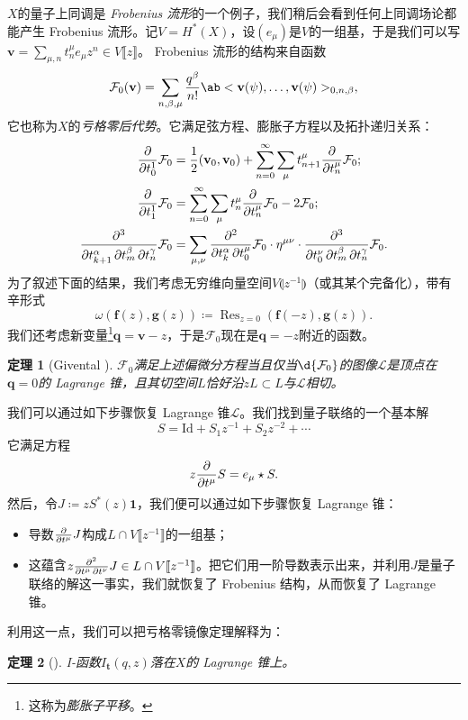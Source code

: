 \documentclass{amsart}
\newtheorem{thm}{定理}[section]
\theoremstyle{definition}
\theoremstyle{remark}
\theoremstyle{plain}
\theoremstyle{definition}
\theoremstyle{remark}
\newcommand{\mc}[1]{\mathcal{#1}}
\newcommand{\mbf}[1]{\mathbf{#1}}
\newcommand{\bv}{\mbf{v}}
\newcommand{\bq}{\mbf{q}}
\newcommand{\mr}[1]{\mathrm{#1}}
\newcommand{\on}[1]{\operatorname{#1}}
\newcommand{\1}{\mathbf{1}}
\newcommand{\2}{\mathbf{2}}
\newcommand{\3}{\mathbf{3}}
\newcommand{\ps}[1]{\llbracket #1 \rrbracket}
\newcommand{\ls}[1]{\llparenthesis #1 \rrparenthesis}
\begin{document}
\(X\)的量子上同调是 \textit{Frobenius 流形}的一个例子，我们稍后会看到任何上同调场论都能产生 Frobenius 流形。记\(V = H^*(X)\)，设\((e_{\mu})\)是\(V\)的一组基，于是我们可以写$\bv = \sum_{\mu,n} t^{\mu}_n e_{\mu} z^n \in V\ps{z}$。
Frobenius 流形的结构来自函数
\[
    \mc{F}_0(\bv) = \sum_{n, \beta, \mu} \frac{q^{\beta}}{n!} \ab<\bv(\psi), \ldots, \bv(\psi)>_{0,n,\beta},
\]
它也称为\(X\)的\textit{亏格零后代势}。它满足弦方程、膨胀子方程以及拓扑递归关系：
\begin{align*}
    \pdv{}{t_0^1} \mc{F}_0 &= \frac{1}{2} (\bv_0, \bv_0) + \sum_{n=0}^{\infty} \sum_{\mu} t_{n+1}^{\mu} \pdv{}{t_n^{\mu}} \mc{F}_0; \\
    \pdv{}{t_1^1} \mc{F}_0 &= \sum_{n=0}^{\infty} \sum_{\mu} t_n^{\mu} \pdv{}{t_n^{\mu}}\mc{F}_0 - 2 \mc{F}_0; \\
    \pdv{}{t_{k+1}^{\alpha},t_m^{\beta},t_n^{\gamma}} \mc{F}_0 &= \sum_{\mu,\nu} \pdv{}{t_k^{\alpha},t_0^{\mu}} \mc{F}_0 \cdot \eta^{\mu\nu} \cdot \pdv{}{t_0^{\nu},t_{m}^{\beta},t_n^{\gamma}} \mc{F}_0.
\end{align*}
为了叙述下面的结果，我们考虑无穷维向量空间$V\ls{z^{-1}}$（或其某个完备化），带有辛形式
\[ \omega(\mbf{f}(z), \mbf{g}(z)) \coloneqq \on{Res}_{z=0}(\mbf{f}(-z), \mbf{g}(z)). \]
我们还考虑新变量\footnote{这称为\textit{膨胀子平移}。}$\bq = \bv - z$，于是$\mc{F}_0$现在是$\bq = -z$附近的函数。

\begin{thm}[Givental {\cite{Givental2004}}]
    $\mc{F}_0$满足上述偏微分方程当且仅当$\d{\mc{F}_0}$的图像$\mc{L}$是顶点在$\bq = 0$的 Lagrange 锥，且其切空间$L$恰好沿$zL \subset L$与$\mc{L}$相切。
\end{thm}

我们可以通过如下步骤恢复 Lagrange 锥$\mc{L}$。我们找到量子联络的一个基本解
\[ S = \mr{Id} + S_1 z^{-1} + S_2 z^{-2} + \cdots \]
它满足方程
\[ z \pdv{}{t^{\mu}}S = e_{\mu} \star S. \]
然后，令$J \coloneqq z S^*(z) \1$，我们便可以通过如下步骤恢复 Lagrange 锥：
\begin{itemize}
    \item 导数$\pdv{}{t^{\mu}} J$构成$L \cap V\ps{z^{-1}}$的一组基；
    \item 这蕴含$z \pdv{}{t^{\mu},t^{\nu}} J \in L \cap V \ps{z^{-1}}$。把它们用一阶导数表示出来，并利用$J$是量子联络的解这一事实，我们就恢复了 Frobenius 结构，从而恢复了 Lagrange 锥。
\end{itemize}

利用这一点，我们可以把亏格零镜像定理解释为：
\begin{thm}[{\cite{Givental1998}}]
    I-函数\(I_{\mbf{t}}(q,z)\)落在\(X\)的 Lagrange 锥上。
\end{thm}
\end{document}
